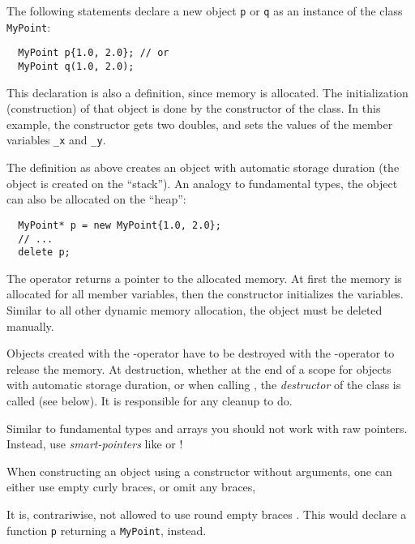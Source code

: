 The following statements declare a new object \texttt{p} or \texttt{q} as an instance of the class \texttt{MyPoint}:
%
\begin{verbatim}
  MyPoint p{1.0, 2.0}; // or
  MyPoint q(1.0, 2.0);
\end{verbatim}
%
This declaration is also a definition, since memory is allocated. The initialization (construction) of that object is done by the constructor of the class.
In this example, the constructor gets two doubles, and sets the values of the member variables \texttt{\_x} and \texttt{\_y}.

The definition as above creates an object with automatic storage duration (\ie the object is created on the ``stack''). An analogy to fundamental types,
the object can also be allocated on the ``heap'':
%
\begin{verbatim}
  MyPoint* p = new MyPoint{1.0, 2.0};
  // ...
  delete p;
\end{verbatim}
The operator  returns a pointer to the allocated memory. At first the memory is allocated for all member variables, then the constructor initializes
the variables. Similar to all other dynamic memory allocation, the object must be deleted manually.

Objects created with the -operator have to be destroyed with the -operator to release the memory. At destruction, whether at the end of
a scope for objects with automatic storage duration, or when calling , the \emph{destructor} of the class is called (see below). It is responsible
for any cleanup to do.

\begin{rem}
  Similar to fundamental types and arrays you should not work with raw pointers. Instead, use \emph{smart-pointers} like  or !
\end{rem}

\begin{rem}
  When constructing an object using a constructor without arguments, one can either use empty curly braces, \ie
  or omit any braces, \ie

  It is, contrariwise, not allowed to use round empty braces . This would declare a function \texttt{p} returning a \texttt{MyPoint}, instead.
\end{rem}


